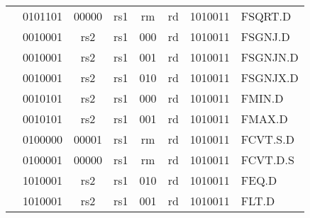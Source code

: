 \begin{table}[p]
\begin{small}
\begin{center}
\begin{tabular}{p{0in}p{0.4in}p{0.05in}p{0.05in}p{0.05in}p{0.05in}p{0.4in}p{0.6in}p{0.4in}p{0.6in}p{0.7in}l}
&
\multicolumn{4}{|c|}{0101101} &
\multicolumn{2}{c|}{00000} &
\multicolumn{1}{c|}{rs1} &
\multicolumn{1}{c|}{rm} &
\multicolumn{1}{c|}{rd} &
\multicolumn{1}{c|}{1010011} & FSQRT.D \\
\cline{2-11}
  

&
\multicolumn{4}{|c|}{0010001} &
\multicolumn{2}{c|}{rs2} &
\multicolumn{1}{c|}{rs1} &
\multicolumn{1}{c|}{000} &
\multicolumn{1}{c|}{rd} &
\multicolumn{1}{c|}{1010011} & FSGNJ.D \\
\cline{2-11}
  

&
\multicolumn{4}{|c|}{0010001} &
\multicolumn{2}{c|}{rs2} &
\multicolumn{1}{c|}{rs1} &
\multicolumn{1}{c|}{001} &
\multicolumn{1}{c|}{rd} &
\multicolumn{1}{c|}{1010011} & FSGNJN.D \\
\cline{2-11}
  

&
\multicolumn{4}{|c|}{0010001} &
\multicolumn{2}{c|}{rs2} &
\multicolumn{1}{c|}{rs1} &
\multicolumn{1}{c|}{010} &
\multicolumn{1}{c|}{rd} &
\multicolumn{1}{c|}{1010011} & FSGNJX.D \\
\cline{2-11}
  

&
\multicolumn{4}{|c|}{0010101} &
\multicolumn{2}{c|}{rs2} &
\multicolumn{1}{c|}{rs1} &
\multicolumn{1}{c|}{000} &
\multicolumn{1}{c|}{rd} &
\multicolumn{1}{c|}{1010011} & FMIN.D \\
\cline{2-11}
  

&
\multicolumn{4}{|c|}{0010101} &
\multicolumn{2}{c|}{rs2} &
\multicolumn{1}{c|}{rs1} &
\multicolumn{1}{c|}{001} &
\multicolumn{1}{c|}{rd} &
\multicolumn{1}{c|}{1010011} & FMAX.D \\
\cline{2-11}
  

&
\multicolumn{4}{|c|}{0100000} &
\multicolumn{2}{c|}{00001} &
\multicolumn{1}{c|}{rs1} &
\multicolumn{1}{c|}{rm} &
\multicolumn{1}{c|}{rd} &
\multicolumn{1}{c|}{1010011} & FCVT.S.D \\
\cline{2-11}
  

&
\multicolumn{4}{|c|}{0100001} &
\multicolumn{2}{c|}{00000} &
\multicolumn{1}{c|}{rs1} &
\multicolumn{1}{c|}{rm} &
\multicolumn{1}{c|}{rd} &
\multicolumn{1}{c|}{1010011} & FCVT.D.S \\
\cline{2-11}
  

&
\multicolumn{4}{|c|}{1010001} &
\multicolumn{2}{c|}{rs2} &
\multicolumn{1}{c|}{rs1} &
\multicolumn{1}{c|}{010} &
\multicolumn{1}{c|}{rd} &
\multicolumn{1}{c|}{1010011} & FEQ.D \\
\cline{2-11}
  

&
\multicolumn{4}{|c|}{1010001} &
\multicolumn{2}{c|}{rs2} &
\multicolumn{1}{c|}{rs1} &
\multicolumn{1}{c|}{001} &
\multicolumn{1}{c|}{rd} &
\multicolumn{1}{c|}{1010011} & FLT.D \\
\cline{2-11}
  


\end{tabular}
\end{center}
\end{small}
\end{table}

